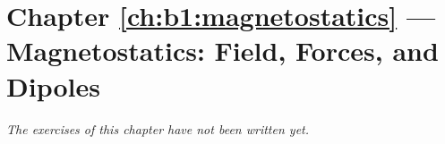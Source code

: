 \section*{Chapter \ref{ch:b1:magnetostatics} --- Magnetostatics: Field, Forces, and Dipoles}


\emph{The exercises of this chapter have not been written yet.}
